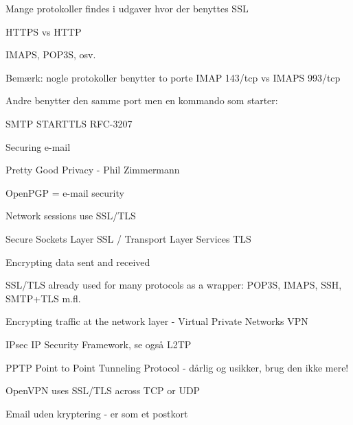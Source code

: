 \documentclass[Screen16to9,17pt]{foils}
\begin{document}

\begin{list1}
\item Mange protokoller findes i udgaver hvor der benyttes SSL
\item HTTPS vs HTTP
\item IMAPS, POP3S, osv.
\item Bemærk: nogle protokoller benytter to porte IMAP 143/tcp vs IMAPS 993/tcp
\item Andre benytter den samme port men en kommando som starter:
\item SMTP STARTTLS RFC-3207
\end{list1}



\begin{list1}
\item Securing e-mail
\begin{list2}
\item Pretty Good Privacy - Phil Zimmermann
\item OpenPGP = e-mail security
\end{list2}
\item Network sessions use SSL/TLS
\begin{list2}
\item Secure Sockets Layer SSL / Transport Layer Services TLS
\item Encrypting data sent and received
\item SSL/TLS already used for many protocols as a wrapper: POP3S, IMAPS, SSH, SMTP+TLS m.fl.
\end{list2}
\item Encrypting traffic at the network layer - Virtual Private Networks VPN
\begin{list2}
\item {\color{green}IPsec IP Security Framework, se også L2TP}
\item {\color{red} PPTP Point to Point Tunneling Protocol - dårlig og usikker, brug den ikke mere!}
\item OpenVPN uses SSL/TLS across TCP or UDP
\end{list2}
\end{list1}



\centerline{Email uden kryptering - er som et postkort}
\end{document}
